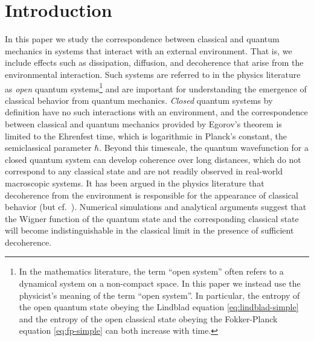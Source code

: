 \documentclass{article}
\numberwithin{equation}{section}
\begin{document}
\newpage
\setcounter{tocdepth}{2} 
\tableofcontents
\phantom{text}

\section{Introduction}
\label{sec:incoherent}



In this paper we study the correspondence between classical and quantum mechanics in systems that interact with an external environment.  That is, we include effects such as dissipation, diffusion, and decoherence that arise from the environmental interaction.  Such systems are referred to in the physics literature as \textit{open} quantum systems\footnote{In the mathematics literature, the term ``open system'' often refers to a dynamical system on a non-compact space.  In this paper we instead use the physicist's meaning of the term ``open system''. In particular, the entropy of the open quantum state obeying the Lindblad equation \ref{eq:lindblad-simple} and the entropy of the open classical state obeying the Fokker-Planck equation \ref{eq:fp-simple} can both increase with time.} and are important for understanding the emergence of classical behavior from quantum mechanics. \textit{Closed} quantum systems by definition have no such interactions with an environment, and the correspondence between classical and quantum mechanics provided by Egorov's theorem \cite{egorov1969canonical, zworski2022semiclassical, combescure1997semiclassical, hagedorn2000exponentially, silvestrov2002ehrenfest, robert2021coherent} is limited to the Ehrenfest time, which is logarithmic in Planck's constant, the semiclassical parameter $\hbar$. Beyond this timescale, the quantum wavefunction for a closed quantum system can develop coherence over long distances, which do not correspond to any classical state and are not readily observed in real-world macroscopic systems.  It has been argued in the physics literature that decoherence from the environment is responsible for the appearance of classical behavior \cite{zeh1973quantum, kubler1973dynamics, zurek1981pointer, zurek1994decoherence, shiokawa1995decoherence, zurek1998decoherence, zurek1999why, perthame2004quantum} (but cf.~\cite{ballentine1994inadequacy,fox1994chaos1,fox1994chaos2,schlautmann1995measurement,casati1995comment,zurek1995zurek,brun1996quantum,emerson2002quantum,wiebe2005quantum, kofler2007classical, kofler2008conditions}). Numerical simulations and analytical arguments \cite{spiller1994emergence, kolovsky1994remark,kolovsky1996condition, habib1998decoherence, bhattacharya2000continuous, bhattacharya2003continuous, zurek2003decoherence, toscano2005decoherence, pattanayak2003parameter, gammal2007quantum} suggest that the Wigner function of the quantum state and the corresponding classical state will become indistinguishable in the classical limit in the presence of sufficient decoherence.
\end{document}
